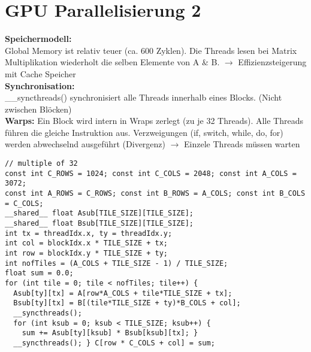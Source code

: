 
\section{GPU Parallelisierung 2}
\textcolor{b}{\textbf{Speichermodell:}}\\
Global Memory ist relativ teuer (ca. 600 Zyklen). Die Threads lesen bei Matrix Multiplikation wiederholt die selben Elemente von A \& B. $\rightarrow$ Effizienzsteigerung mit Cache Speicher\\
\textcolor{b}{\textbf{Synchronisation:}}\\
\textcolor{b}{\_\_syncthreads()} synchronisiert alle Threads innerhalb eines Blocks. (Nicht zwischen Blöcken)\\
\textcolor{b}{\textbf{Warps:}} Ein Block wird intern in Wraps zerlegt (zu je 32 Threads). Alle Threads führen die gleiche Instruktion aus. Verzweigungen (if, switch, while, do, for) werden abwechselnd ausgeführt (Divergenz) $\rightarrow$ Einzele Threads müssen warten
\begin{lstlisting}
// multiple of 32
const int C_ROWS = 1024; const int C_COLS = 2048; const int A_COLS = 3072;
const int A_ROWS = C_ROWS; const int B_ROWS = A_COLS; const int B_COLS = C_COLS;
__shared__ float Asub[TILE_SIZE][TILE_SIZE];
__shared__ float Bsub[TILE_SIZE][TILE_SIZE];
int tx = threadIdx.x, ty = threadIdx.y;
int col = blockIdx.x * TILE_SIZE + tx;
int row = blockIdx.y * TILE_SIZE + ty;
int nofTiles = (A_COLS + TILE_SIZE - 1) / TILE_SIZE;
float sum = 0.0;
for (int tile = 0; tile < nofTiles; tile++) {
  Asub[ty][tx] = A[row*A_COLS + tile*TILE_SIZE + tx];
  Bsub[ty][tx] = B[(tile*TILE_SIZE + ty)*B_COLS + col];
  __syncthreads();
  for (int ksub = 0; ksub < TILE_SIZE; ksub++) {
    sum += Asub[ty][ksub] * Bsub[ksub][tx]; }
  __syncthreads(); } C[row * C_COLS + col] = sum;
\end{lstlisting}